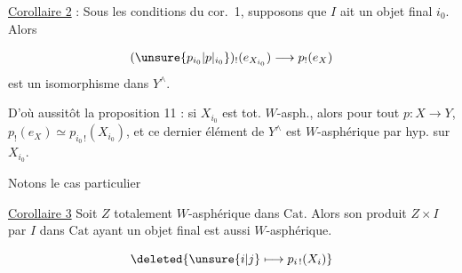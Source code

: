 \uline{Corollaire 2} : Sous les conditions du cor.~1, supposons que $I$ ait un objet final $i_0$. Alors

\[
(\unsure{p_{i_0}|p\vert_{i_0}})_!(e_{X_{i_0}})\longrightarrow p_!(e_X)
\]
est un isomorphisme dans $Y^\wedge$.

D'où aussitôt la proposition 11 : si $X_{i_0}$ est  tot. $W$-asph., alors  pour tout $p:X\to Y$, $p_!(e_X)\simeq p_{i_0\,!}(X_{i_0})$, et ce dernier élément de $Y^\wedge$ est $W$-asphérique par hyp. sur $X_{i_0}$.

Notons le cas particulier

\uline{Corollaire 3} Soit $Z$   totalement $W$-asphérique dans $\mathrm{Cat}$. Alors son produit $Z\times I$ par  $I$ dans $\mathrm{Cat}$ ayant un objet final est aussi  $W$-asphérique.


\[
\deleted{\unsure{i|j}\longmapsto p_{i\,!}(X_i)}
\]
